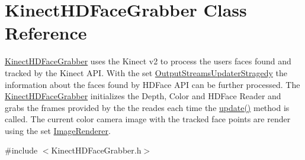 \hypertarget{class_kinect_h_d_face_grabber}{}\section{Kinect\+H\+D\+Face\+Grabber Class Reference}
\label{class_kinect_h_d_face_grabber}


\hyperlink{class_kinect_h_d_face_grabber}{Kinect\+H\+D\+Face\+Grabber} uses the Kinect v2 to process the users faces found and tracked by the Kinect A\+P\+I. With the set \hyperlink{class_output_streams_updater_stragedy}{Output\+Streams\+Updater\+Stragedy} the information about the faces found by H\+D\+Face A\+P\+I can be further processed. The \hyperlink{class_kinect_h_d_face_grabber}{Kinect\+H\+D\+Face\+Grabber} initializes the Depth, Color and H\+D\+Face Reader and grabs the frames provided by the the reades each time the \hyperlink{class_kinect_h_d_face_grabber_a619b994aaca778dd7d8ce180b59a6667}{update()} method is called. The current color camera image with the tracked face points are render using the set \hyperlink{class_image_renderer}{Image\+Renderer}.  




{\ttfamily \#include $<$Kinect\+H\+D\+Face\+Grabber.\+h$>$}

